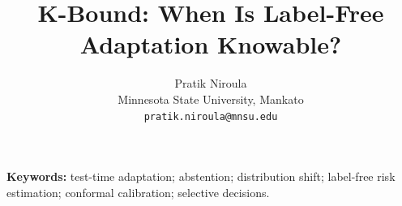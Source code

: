 \documentclass[11pt,twocolumn]{article}
\title{\vspace{-1.5em}\textbf{K-Bound: When Is Label-Free Adaptation Knowable?}}
\author{Pratik Niroula\\
\small Minnesota State University, Mankato\\
\small \texttt{pratik.niroula@mnsu.edu}}
\date{}
\theoremstyle{plain}
\theoremstyle{definition}
\theoremstyle{remark}
\begin{document}
\maketitle
\begin{abstract}\end{abstract}
\noindent\textbf{Keywords:} test-time adaptation; abstention; distribution shift;
label-free risk estimation; conformal calibration; selective decisions.

{\footnotesize}
\end{document}
